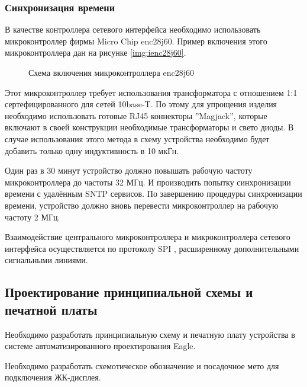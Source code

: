 \subsubsection{Синхронизация времени}
\begin{par}
В качестве контроллера сетевого интерфейса необходимо использовать микроконтроллер фирмы Micro Chip
enc28j60. Пример включения этого микроконтроллера дан на рисунке \ref{img:ienc28j60}.
\begin{figure}[h]
	\caption{Схема включения микроконтроллера enc28j60}
	\label{img:avrdacp}
\end{figure}

Этот микроконтроллер требует использования трансформатора с отношением 1:1 сертефицированного
для сетей 10base-T. По этому для упрощения изделия необходимо использовать готовые RJ45
коннекторы ''Magjack'', которые включают в своей конструкции необходимые трансформаторы и
свето диоды. В случае использования этого метода в схему устройства необходимо будет добавить
только одну индуктивность в 10 мкГн.
\end{par}

\begin{par}
Один раз в 30 минут устройство должно повышать рабочую частоту микроконтроллера до частоты 32 МГц.
И производить попытку синхронизации времени с удалённым SNTP сервисов. По завершению процедуры
синхронизации времени, устройство должно вновь перевести микроконтроллер на рабочую частоту 2 МГц.
\end{par}

\begin{par}
Взаимодействие центрального микроконтроллера и микроконтроллера сетевого интерфейса осуществляется
по протоколу SPI \cite{enc28j60}, расширенному дополнительными сигнальными линиями.
\end{par}


\subsection{Проектирование принципиальной схемы и печатной платы}
\begin{par}
Необходимо разработать принципиальную схему и печатную плату устройства в системе автоматизированного
проектирования Eagle.
\end{par}

\begin{par}
Необходимо разработать схемотическое обозначение и посадочное мето для подключения ЖК-дисплея.
\end{par}

